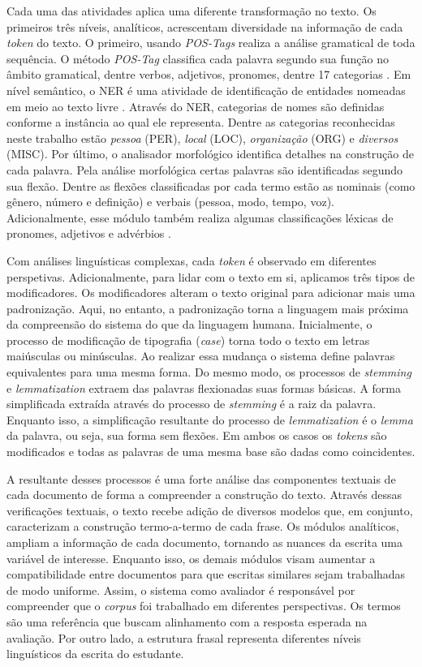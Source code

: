 Cada uma das atividades aplica uma diferente transformação no texto. Os primeiros três níveis, analíticos, acrescentam diversidade na informação de cada \textit{token} do texto. O primeiro, usando \textit{POS-Tags} realiza a análise gramatical de toda sequência. O método \textit{POS-Tag} classifica cada palavra segundo sua função no âmbito gramatical, dentre verbos, adjetivos, pronomes, dentre 17 categorias \cite{}. Em nível semântico, o NER é uma atividade de identificação de entidades nomeadas em meio ao texto livre \cite{pirovani2018}. Através do NER, categorias de nomes são definidas conforme a instância ao qual ele representa. Dentre as categorias reconhecidas neste trabalho estão \textit{pessoa} (PER), \textit{local} (LOC), \textit{organização} (ORG) e \textit{diversos} (MISC). Por último, o analisador morfológico identifica detalhes na construção de cada palavra. Pela análise morfológica certas palavras são identificadas segundo sua flexão. Dentre as flexões classificadas por cada termo estão as nominais (como gênero, número e definição) e verbais (pessoa, modo, tempo, voz). Adicionalmente, esse módulo também realiza algumas classificações léxicas de pronomes, adjetivos e advérbios \cite{universaldependencies}.

Com análises linguísticas complexas, cada \textit{token} é observado em diferentes perspetivas. Adicionalmente, para lidar com o texto em si, aplicamos três tipos de modificadores. Os modificadores alteram o texto original para adicionar mais uma padronização. Aqui, no entanto, a padronização torna a linguagem mais próxima da compreensão do sistema do que da linguagem humana. Inicialmente, o processo de modificação de tipografia (\textit{case}) torna todo o texto em letras maiúsculas ou minúsculas. Ao realizar essa mudança o sistema define palavras equivalentes para uma mesma forma. Do mesmo modo, os processos de \textit{stemming} e \textit{lemmatization} extraem das palavras flexionadas suas formas básicas. A forma simplificada extraída através do processo de \textit{stemming} é a raiz da palavra. Enquanto isso, a simplificação resultante do processo de \textit{lemmatization} é o \textit{lemma} da palavra, ou seja, sua forma sem flexões. Em ambos os casos os \textit{tokens} são modificados e todas as palavras de uma mesma base são dadas como coincidentes.

A resultante desses processos é uma forte análise das componentes textuais de cada documento de forma a compreender a construção do texto. Através dessas verificações textuais, o texto recebe adição de diversos modelos que, em conjunto, caracterizam a construção termo-a-termo de cada frase. Os módulos analíticos, ampliam a informação de cada documento, tornando as nuances da escrita uma variável de interesse. Enquanto isso, os demais módulos visam aumentar a compatibilidade entre documentos para que escritas similares sejam trabalhadas de modo uniforme. Assim, o sistema como avaliador é responsável por compreender que o \textit{corpus} foi trabalhado em diferentes perspectivas. Os termos são uma referência que buscam alinhamento com a resposta esperada na avaliação. Por outro lado, a estrutura frasal representa diferentes níveis linguísticos da escrita do estudante.

